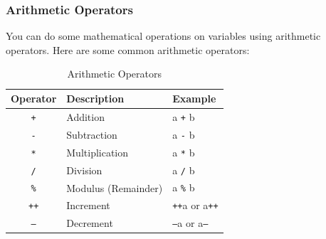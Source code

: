 \documentclass[xcolor=dvipsnames]{beamer}
\begin{document}
    \begin{frame}
        \frametitle{Arithmetic Operators}
        You can do some mathematical operations on variables using arithmetic operators. Here are some common arithmetic operators:
        \begin{table}[h]
        \centering
        \caption{Arithmetic Operators}
        \begin{tabular}{cll}
        \toprule
        \textbf{Operator} & \textbf{Description} & \textbf{Example} \\
         \midrule
            \texttt{+}  & Addition & a \texttt{+} b \\
            \texttt{-}  & Subtraction & a \texttt{-} b \\
            \texttt{*}  & Multiplication & a \texttt{*} b \\
            \texttt{/}  & Division & a \texttt{/} b \\
            \texttt{\%}  & Modulus (Remainder) & a \texttt{\%} b \\
            \texttt{++} & Increment & \texttt{++}a or a\texttt{++} \\
            \texttt{--} & Decrement & \texttt{--}a or a\texttt{--} \\
        \bottomrule
        \end{tabular}
        \end{table}
    \end{frame}
\end{document}
